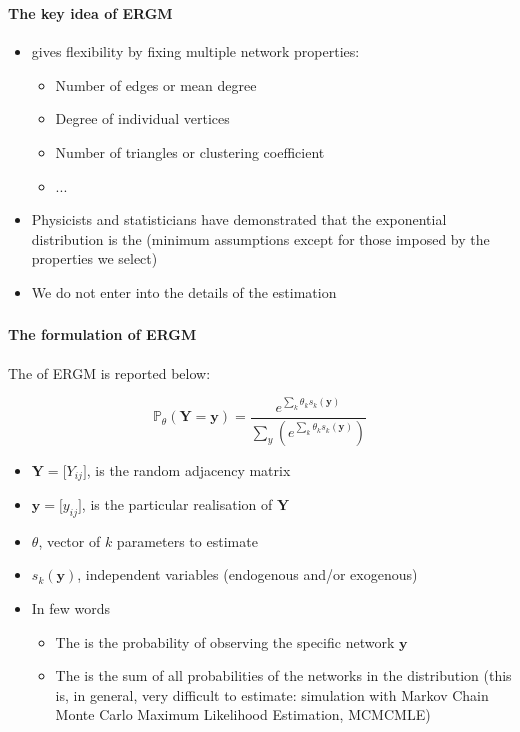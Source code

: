 \documentclass[8pt]{beamer}
\begin{document}
\begin{frame}
\frametitle{\insertsection}
\framesubtitle{The key idea of ERGM}

\begin{itemize}

\item {\color{blue}{ERGM}} gives flexibility by fixing multiple network properties:
	\begin{itemize}
	\item Number of edges or mean degree
	\item Degree of individual vertices
	\item Number of triangles or clustering coefficient
	\item ...
	\end{itemize}

\item Physicists and statisticians have demonstrated that the exponential distribution is the {\color{blue}{`best choice'}} (minimum assumptions except for those imposed by the properties we select)

\item We do not enter into the details of the estimation 

\end{itemize}

\end{frame}


\begin{frame}
\frametitle{\insertsection}
\framesubtitle{The formulation of ERGM}

The {\color{blue}{general formulation}} of ERGM is reported below:

\begin{equation*}
\mathbb{P}_\theta({\mathbf{Y} = \mathbf{y}}) = \frac{e^{\sum_k \theta_k s_k(\mathbf{y})}}{\sum_y(e^{\sum_k \theta_k s_k(\mathbf{y})})}
\end{equation*}


\begin{itemize}
\item $\mathbf{Y}=\lbrack Y_{ij} \rbrack$, is the random adjacency matrix
\item $\mathbf{y}=\lbrack y_{ij} \rbrack$, is the particular realisation of $\mathbf{Y}$
\item $\theta$, vector of $k$ parameters to estimate 
\item $s_k(\mathbf{y})$, independent variables (endogenous and/or exogenous)
\item In few words
	\begin{itemize}
	\item The {\color{blue}{numerator}} is the probability of observing the specific network $\mathbf{y}$
	\item The {\color{blue}{denominator}} is the sum of all probabilities of the networks in the distribution (this is, in general, very difficult to estimate: simulation with Markov Chain Monte Carlo Maximum Likelihood Estimation, MCMCMLE)
	\end{itemize}
\end{itemize}
\end{frame}
\end{document}
